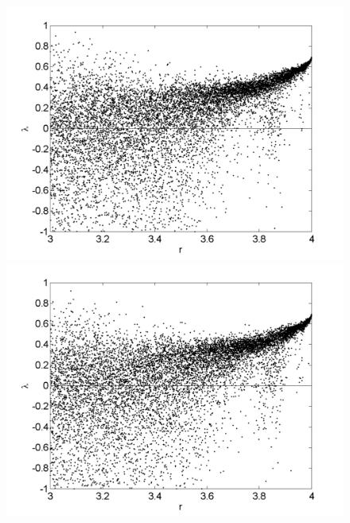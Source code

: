 \begin{figure}[!h]
\includegraphics[width=.5\textwidth]{figs/rlog_lyap_L_07.png}\hfill
\includegraphics[width=.5\textwidth]{figs/rlog_lyap_L_09.png}\\
\end{figure}

